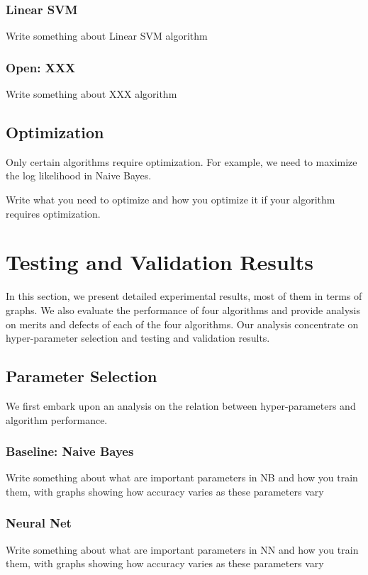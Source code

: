 \documentclass{acm_proc_article-sp}
\begin{document}
\subsubsection{Linear SVM }
Write something about Linear SVM algorithm

\subsubsection{Open: XXX}
Write something about XXX algorithm

\subsection{Optimization}
Only certain algorithms require optimization. For example, we need to maximize the log likelihood in Naive Bayes. 

Write what you need to optimize and how you optimize it if your algorithm requires optimization.







\section{Testing and Validation Results}
In this section, we present detailed experimental results, most of them in terms of graphs. We also evaluate the performance of four algorithms and provide analysis on merits and defects of each of the four algorithms. Our analysis concentrate on hyper-parameter selection and testing and validation results.

\subsection{Parameter Selection}
We first embark upon an analysis on the relation between hyper-parameters and algorithm performance.
 
\subsubsection{Baseline: Naive Bayes}
Write something about what are important parameters in NB and how you train them, with graphs showing how accuracy varies as these parameters vary

\subsubsection{Neural Net}
Write something about what are important parameters in NN and how you train them, with graphs showing how accuracy varies as these parameters vary
\end{document}
